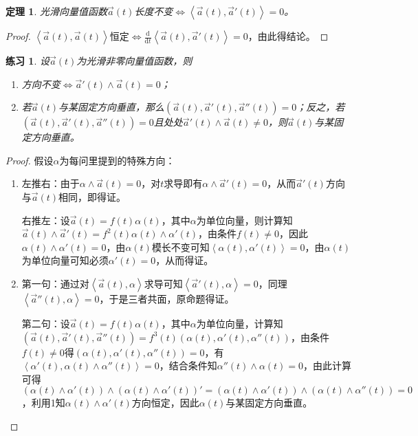 \documentclass[a4paper,UTF8,fontset=windows]{ctexart}
\newtheorem{thm}{定理}[section]
\newtheorem*{hw}{练习}
\begin{document}
\begin{thm}
光滑向量值函数$\vec{a}(t)$长度不变$\Longleftrightarrow\left<\vec{a}(t),\vec{a}'(t)\right>=0$。
\end{thm}

\begin{proof}
$\left<\vec{a}(t),\vec{a}(t)\right>$恒定$\Longleftrightarrow\frac{\mathrm{d}}{\mathrm{d}t}\left<\vec{a}(t),\vec{a}'(t)\right>=0$，由此得结论。
\end{proof}

\begin{hw}
设$\vec{a}(t)$为光滑非零向量值函数，则

\begin{enumerate}
    \item 方向不变$\Longleftrightarrow \vec{a}'(t)\wedge\vec{a}(t)=0$；
    \item 若$\vec{a}(t)$与某固定方向垂直，那么$\left(\vec{a}(t),\vec{a}'(t),\vec{a}''(t)\right)=0$；反之，若$\left(\vec{a}(t),\vec{a}'(t),\vec{a}''(t)\right)=0$且处处$\vec{a}'(t)\wedge\vec{a}(t)\ne0$，则$\vec{a}(t)$与某固定方向垂直。
\end{enumerate}
\end{hw}

\begin{proof}
假设$\alpha$为每问里提到的特殊方向：
\begin{enumerate}
    \item
    左推右：由于$\alpha\wedge\vec{a}(t)=0$，对$t$求导即有$\alpha\wedge\vec{a}'(t)=0$，从而$\vec{a}'(t)$方向与$\vec{a}(t)$相同，即得证。
    
    右推左：设$\vec{a}(t)=f(t)\alpha(t)$，其中$\alpha$为单位向量，则计算知$\vec{a}(t)\wedge\vec{a}'(t)=f^2(t)\alpha(t)\wedge\alpha'(t)$，由条件$f(t)\ne0$，因此$\alpha(t)\wedge\alpha'(t)=0$，由$\alpha(t)$模长不变可知$\left<\alpha(t),\alpha'(t)\right>=0$，由$\alpha(t)$为单位向量可知必须$\alpha'(t)=0$，从而得证。
        
    \item
    第一句：通过对$\left<\vec{a}(t),\alpha\right>$求导可知$\left<\vec{a}'(t),\alpha\right>=0$，同理$\left<\vec{a}''(t),\alpha\right>=0$，于是三者共面，原命题得证。

    第二句：设$\vec{a}(t)=f(t)\alpha(t)$，其中$\alpha$为单位向量，计算知$\left(\vec{a}(t),\vec{a}'(t),\vec{a}''(t)\right)=f^3(t)(\alpha(t),\alpha'(t),\alpha''(t))$，由条件$f(t)\ne0$得$(\alpha(t),\alpha'(t),\alpha''(t))=0$，有$\left<\alpha'(t),\alpha(t)\wedge\alpha''(t)\right>=0$，结合条件知$\alpha''(t)\wedge\alpha(t)=0$，由此计算可得$(\alpha(t)\wedge\alpha'(t))\wedge(\alpha(t)\wedge\alpha'(t))'=(\alpha(t)\wedge\alpha'(t))\wedge(\alpha(t)\wedge\alpha''(t))=0$，利用1知$\alpha(t)\wedge\alpha'(t)$方向恒定，因此$\alpha(t)$与某固定方向垂直。
\end{enumerate}
\end{proof}
\end{document}
